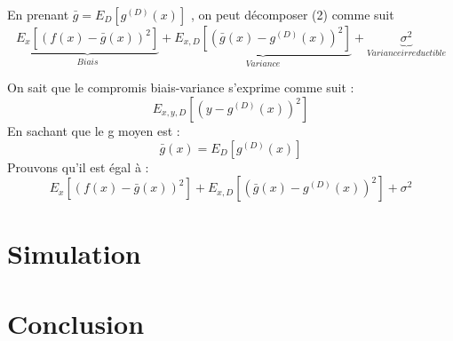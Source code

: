 \documentclass[a4paper]{article}
\begin{document}
En prenant $ \bar{g} = E_D[g^{(D)}(x)]$ , on peut décomposer (2) comme suit 
\[ \underbrace{E_x[(f(x) - \bar{g}(x))^2]}_{Biais} + \underbrace{E_{x,D}[(\bar{g}(x) - g^{(D)}(x))^2]}_{Variance} + \underbrace{\sigma^2}_{Variance irreductible} \]

\newpage

On sait que le compromis biais-variance s'exprime comme suit : 
\[ E_{x,y,D}[(y-g^{(D)}(x))^2] \]
En sachant que le g moyen est :
\begin{equation}
\label{g_moyen}
\bar{g}(x) = E_D [g^{(D)}(x)]
\end{equation}
Prouvons qu'il est égal à :
\[ E_x[(f(x) - \bar{g}(x))^2] + E_{x,D}[(\bar{g}(x) - g^{(D)}(x))^2] + \sigma^2 \]

\section{Simulation}
 
\newpage

\section{Conclusion}

\newpage
\end{document}
